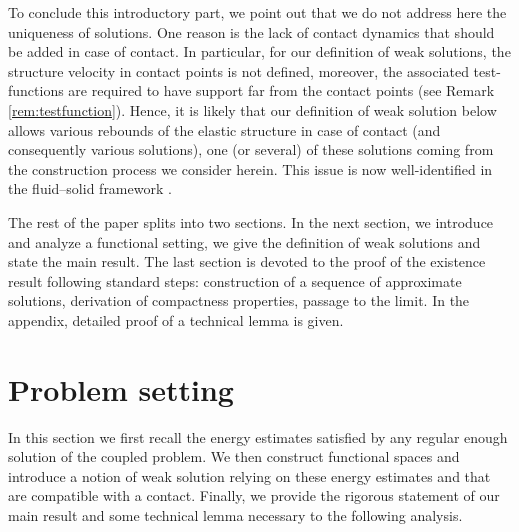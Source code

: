 \documentclass[11pt]{article}
\theoremstyle{remark}
\theoremstyle{definition}
\begin{document}
To conclude this introductory part, we point out that we do not address here the uniqueness of solutions. One reason is the lack of contact dynamics that should be added in case of contact. In particular, for our definition of weak solutions, the structure velocity in contact points is not defined, moreover, the associated test-functions are required to have support far from the contact points (see Remark \ref{rem:testfunction}). Hence, it is likely that our definition of weak solution below allows various rebounds of the elastic structure in case of contact (and consequently various solutions), one (or several) of these solutions coming from the construction process we consider herein. This issue is now well-identified in the fluid--solid framework \cite{Starovoitov03}.

The rest of the paper splits into two sections. In the next section, we introduce and analyze a functional setting, we give the definition of weak solutions and state the main result.
The last section is devoted to the proof of the existence result following standard steps: construction of a sequence of approximate solutions, derivation of compactness properties, passage to the limit. In the appendix, detailed proof of a technical lemma is given.

\section{Problem setting}
In this section we first recall the energy estimates satisfied by any regular enough solution of the coupled problem. We then construct functional spaces and introduce a notion of weak solution relying on these energy estimates and that are compatible with a contact. Finally, we provide the rigorous statement of our main result and some technical lemma necessary to the following analysis.
\end{document}

